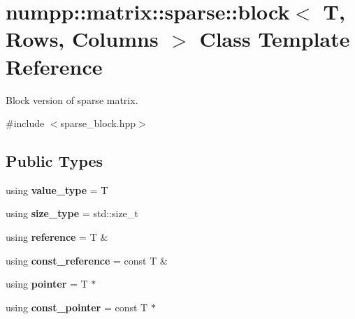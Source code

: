 \hypertarget{classnumpp_1_1matrix_1_1sparse_1_1block}{}\section{numpp\+:\+:matrix\+:\+:sparse\+:\+:block$<$ T, Rows, Columns $>$ Class Template Reference}
\label{classnumpp_1_1matrix_1_1sparse_1_1block}


Block version of sparse matrix.  




{\ttfamily \#include $<$sparse\+\_\+block.\+hpp$>$}

\subsection*{Public Types}
\begin{DoxyCompactItemize}
\item 
\mbox{\label{classnumpp_1_1matrix_1_1sparse_1_1block_ae63cfc45208606404488f5fe326bb1d3}} 
using {\bfseries value\+\_\+type} = T
\item 
\mbox{\label{classnumpp_1_1matrix_1_1sparse_1_1block_a9cc87ccc78269d5061ede24a826095b7}} 
using {\bfseries size\+\_\+type} = std\+::size\+\_\+t
\item 
\mbox{\label{classnumpp_1_1matrix_1_1sparse_1_1block_a2e487b67c00d269e7e64f59548e9de61}} 
using {\bfseries reference} = T \&
\item 
\mbox{\label{classnumpp_1_1matrix_1_1sparse_1_1block_a469a9838360107bb0ad15b5f8b22910f}} 
using {\bfseries const\+\_\+reference} = const T \&
\item 
\mbox{\label{classnumpp_1_1matrix_1_1sparse_1_1block_a51437641f0fb291201fa88ade1ecc187}} 
using {\bfseries pointer} = T $\ast$
\item 
\mbox{\label{classnumpp_1_1matrix_1_1sparse_1_1block_a810d06f6c2e6b0e92f73bbb971eeff7c}} 
using {\bfseries const\+\_\+pointer} = const T $\ast$
\end{DoxyCompactItemize}
